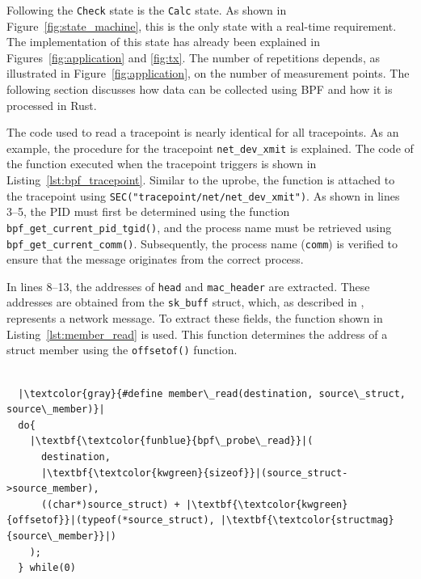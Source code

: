 Following the \texttt{Check} state is the \texttt{Calc} state.  
As shown in Figure~\ref{fig:state_machine}, this is the only state with a real-time requirement.  
The implementation of this state has already been explained in Figures~\ref{fig:application} and \ref{fig:tx}.  
The number of repetitions depends, as illustrated in Figure~\ref{fig:application}, on the number of measurement points.  
The following section discusses how data can be collected using \ac{BPF} and how it is processed in Rust.  

The code used to read a tracepoint is nearly identical for all tracepoints.  
As an example, the procedure for the tracepoint \texttt{net\_dev\_xmit} is explained.  
The code of the function executed when the tracepoint triggers is shown in Listing~\ref{lst:bpf_tracepoint}.  
Similar to the \ac{uprobe}, the function is attached to the tracepoint using \texttt{SEC("tracepoint/net/net\_dev\_xmit")}.  
As shown in lines 3–5, the \ac{PID} must first be determined using the function \texttt{bpf\_get\_current\_pid\_tgid()}, and the process name must be retrieved using \texttt{bpf\_get\_current\_comm()}.  
Subsequently, the process name (\texttt{comm}) is verified to ensure that the message originates from the correct process.  

In lines 8–13, the addresses of \texttt{head} and \texttt{mac\_header} are extracted.  
These addresses are obtained from the \texttt{sk\_buff} struct, which, as described in \cite{sk_buff}, represents a network message.  
To extract these fields, the function shown in Listing~\ref{lst:member_read} is used.  
This function determines the address of a struct member using the \texttt{offsetof()} function.  

\begin{listing}[ht]
    \centering
\begin{verbatim}

  |\textcolor{gray}{#define member\_read(destination, source\_struct, source\_member)}|               
  do{                                                                          
    |\textbf{\textcolor{funblue}{bpf\_probe\_read}}|(                                                            
      destination,                                                             
      |\textbf{\textcolor{kwgreen}{sizeof}}|(source_struct->source_member),                                    
      ((char*)source_struct) + |\textbf{\textcolor{kwgreen}{offsetof}}|(typeof(*source_struct), |\textbf{\textcolor{structmag}{source\_member}}|) 
    );                                                                         
  } while(0)

\end{verbatim}
\caption{Function to read members out of a struct}
\label{lst:member_read}
\end{listing}

